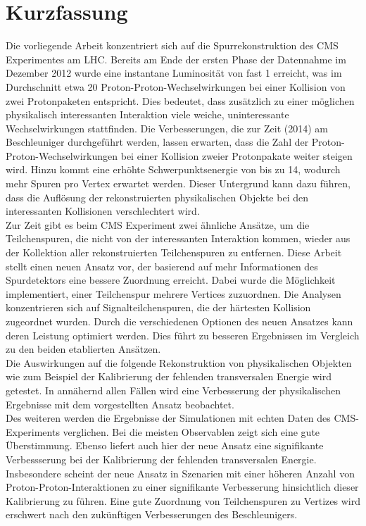 
\chapter*{Kurzfassung}

Die vorliegende Arbeit konzentriert sich auf die Spurrekonstruktion des CMS Experimentes am LHC. Bereits am Ende der ersten Phase der Datennahme im Dezember 2012 wurde  eine instantane Luminosit\"a{}t von fast 1\percms{} erreicht, was im Durchschnitt etwa 20 Proton-Proton-Wechselwirkungen bei einer Kollision von zwei Protonpaketen entspricht. Dies bedeutet, dass zus\"a{}tzlich zu einer m\"o{}glichen physikalisch interessanten Interaktion viele weiche, uninteressante Wechselwirkungen stattfinden. Die Verbesserungen, die zur Zeit (2014) am Beschleuniger durchgef\"u{}hrt werden, lassen erwarten, dass die Zahl der Proton-Proton-Wechselwirkungen bei einer Kollision zweier Protonpakate weiter steigen wird. Hinzu kommt eine erh\"o{}hte Schwerpunktsenergie von bis zu 14\TeV{}, wodurch mehr Spuren pro Vertex erwartet werden. Dieser Untergrund kann dazu f\"u{}hren, dass die Aufl\"o{}sung der rekonstruierten physikalischen Objekte bei den interessanten Kollisionen verschlechtert wird. \\
Zur Zeit gibt es beim CMS Experiment zwei \"a{}hnliche Ans\"a{}tze, um die Teilchenspuren, die nicht von der interessanten Interaktion kommen, wieder aus der Kollektion aller rekonstruierten Teilchenspuren zu entfernen. Diese Arbeit stellt einen neuen Ansatz vor, der basierend auf mehr Informationen des Spurdetektors eine bessere Zuordnung erreicht. Dabei wurde die M\"o{}glichkeit implementiert, einer Teilchenspur mehrere Vertices zuzuordnen. Die Analysen konzentrieren sich auf Signalteilchenspuren, die der h\"a{}rtesten Kollision zugeordnet wurden. Durch die verschiedenen Optionen des neuen Ansatzes kann deren Leistung optimiert werden. Dies f\"u{}hrt zu besseren Ergebnissen im Vergleich zu den beiden etablierten Ans\"a{}tzen. \\
Die Auswirkungen auf die folgende Rekonstruktion von physikalischen Objekten wie zum Beispiel der Kalibrierung der fehlenden transversalen Energie wird getestet. In ann\"a{}hernd allen F\"a{}llen wird eine Verbesserung der physikalischen Ergebnisse mit dem vorgestellten Ansatz beobachtet. \\
Des weiteren werden die Ergebnisse der Simulationen mit echten Daten des CMS-Experiments verglichen. Bei die meisten Observablen zeigt sich eine gute \"U{}berstimmung. Ebenso liefert auch hier der neue Ansatz eine signifikante Verbessserung bei der Kalibrierung der fehlenden transversalen Energie. Insbesondere scheint der neue Ansatz in Szenarien mit einer h\"o{}heren Anzahl von Proton-Proton-Interaktionen zu einer signifikante Verbesserung hinsichtlich dieser Kalibrierung zu f\"u{}hren. Eine gute Zuordnung von Teilchenspuren zu Vertizes wird erschwert nach den zuk\"u{}nftigen Verbesserungen des Beschleunigers.

